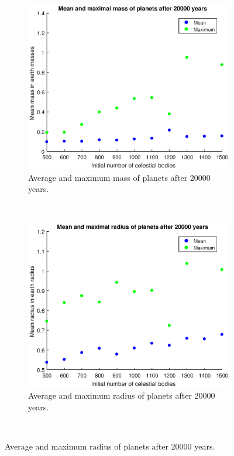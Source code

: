 \begin{figure}[H]
	\centering
	\begin{subfigure}{0.45\textwidth}
	\includegraphics[width=\textwidth]{EindmassaNieuw.eps}
	\caption{Average and maximum mass of planets after 20000 years.}
	\end{subfigure}
	~
	\begin{subfigure}{0.45\textwidth}
	\includegraphics[width=\textwidth]{EindstraalNieuw.eps}
	\caption{Average and maximum radius of planets after 20000 years.}
	\end{subfigure}
	~

\end{figure}
